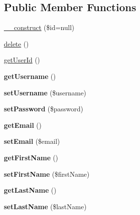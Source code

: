 \subsection*{Public Member Functions}
\begin{DoxyCompactItemize}
\item 
\hyperlink{classUser_a7f239ff8d348251c654efb7c15763ab8}{\_\-\_\-construct} (\$id=null)
\item 
\hyperlink{classUser_a87accb91013ff60d7ecdc1b1f6c02364}{delete} ()
\item 
\hyperlink{classUser_a842606f37f63f53df58430db6e344b0f}{getUserId} ()
\item 
\hypertarget{classUser_aea1f51a8f3da9bc8be76928866ec951f}{
{\bfseries getUsername} ()}
\label{classUser_aea1f51a8f3da9bc8be76928866ec951f}

\item 
\hypertarget{classUser_a50705d2325ec10057594855e83538da9}{
{\bfseries setUsername} (\$username)}
\label{classUser_a50705d2325ec10057594855e83538da9}

\item 
\hypertarget{classUser_aadc1995517c1e8190006d0dba87b28c4}{
{\bfseries setPassword} (\$password)}
\label{classUser_aadc1995517c1e8190006d0dba87b28c4}

\item 
\hypertarget{classUser_acf082b95b344df14b9e8a6c09868dbcd}{
{\bfseries getEmail} ()}
\label{classUser_acf082b95b344df14b9e8a6c09868dbcd}

\item 
\hypertarget{classUser_a018ae17e436e09134922835cdd3235a7}{
{\bfseries setEmail} (\$email)}
\label{classUser_a018ae17e436e09134922835cdd3235a7}

\item 
\hypertarget{classUser_a1797d3f80cc25452b4e97232ef14c6be}{
{\bfseries getFirstName} ()}
\label{classUser_a1797d3f80cc25452b4e97232ef14c6be}

\item 
\hypertarget{classUser_a3c626d0aca50df67aa89793615b7ffd1}{
{\bfseries setFirstName} (\$firstName)}
\label{classUser_a3c626d0aca50df67aa89793615b7ffd1}

\item 
\hypertarget{classUser_af0efc9a6afcaf0774ef627dbc4dbe43e}{
{\bfseries getLastName} ()}
\label{classUser_af0efc9a6afcaf0774ef627dbc4dbe43e}

\item 
\hypertarget{classUser_acbe8bdd002179a3bc115ec7a9afb7e0b}{
{\bfseries setLastName} (\$lastName)}
\label{classUser_acbe8bdd002179a3bc115ec7a9afb7e0b}


\end{DoxyCompactItemize}
